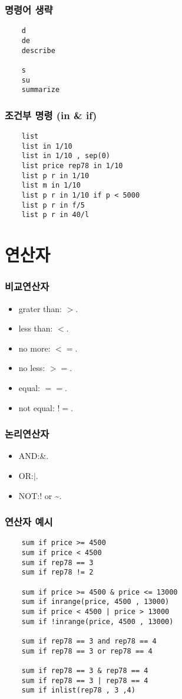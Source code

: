 \documentclass[aspectratio=169,xcolor=dvipsnames,handout]{beamer}
\begin{document}
\begin{frame}[fragile]
    \frametitle{명령어 생략}
    \begin{verbatim}
    d
    de
    describe

    s
    su
    summarize
    \end{verbatim}
\end{frame}

\begin{frame}[fragile]
    \frametitle{조건부 명령 (in \& if)}
    \begin{verbatim}
    list
    list in 1/10
    list in 1/10 , sep(0)
    list price rep78 in 1/10
    list p r in 1/10
    list m in 1/10
    list p r in 1/10 if p < 5000
    list p r in f/5
    list p r in 40/l
    \end{verbatim}
\end{frame}

\section{연산자}

\begin{frame}[allowframebreaks]
    \frametitle{비교연산자}
    \begin{itemize}[<+->]
        \item grater than: $>$.
        \item less than: $<$.
        \item no more: $<=$.
        \item no less: $>=$.
        \item equal: $==$.
        \item not equal: $!=$.
    \end{itemize}
\end{frame}

\begin{frame}[allowframebreaks]
    \frametitle{논리연산자}
    \begin{itemize}[<+->]
        \item AND:\@ \&.
        \item OR:\@ $|$.
        \item NOT:\@! or \textasciitilde.
    \end{itemize}
\end{frame}

\begin{frame}
    \frametitle{연산자 예시}
    \begin{verbatim}
    sum if price >= 4500
    sum if price < 4500
    sum if rep78 == 3
    sum if rep78 != 2
     
    sum if price >= 4500 & price <= 13000
    sum if inrange(price, 4500 , 13000)
    sum if price < 4500 | price > 13000
    sum if !inrange(price, 4500 , 13000)

    sum if rep78 == 3 and rep78 == 4
    sum if rep78 == 3 or rep78 == 4

    sum if rep78 == 3 & rep78 == 4
    sum if rep78 == 3 | rep78 == 4
    sum if inlist(rep78 , 3 ,4)
    \end{verbatim}
\end{frame}
\end{document}
